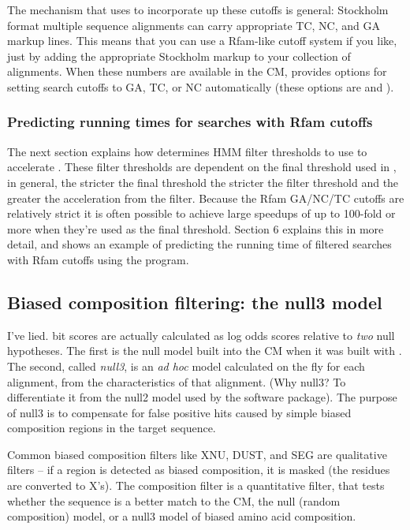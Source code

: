 The mechanism that  uses to incorporate up these cutoffs is
general: Stockholm format multiple sequence alignments can carry
appropriate TC, NC, and GA markup lines. This means that you can use a
Rfam-like cutoff system if you like, just by adding the appropriate
Stockholm markup to your collection of alignments. When these numbers
are available in the CM,  provides options
for setting search cutoffs to GA, TC, or NC automatically (these options
are  and ).

\subsubsection{Predicting running times for searches with Rfam cutoffs}
The next section explains how  determines HMM filter
thresholds to use to accelerate . These filter
thresholds are dependent on the final threshold used in
, in general, the stricter the final threshold the
stricter the filter threshold and the greater the acceleration from
the filter. Because the Rfam GA/NC/TC cutoffs are relatively strict it
is often possible to achieve large speedups of up to 100-fold or more
when they're used as the final threshold. Section 6 explains this in
more detail, and shows an example of predicting the running time of
filtered searches with Rfam cutoffs using the  program.

\subsection{Biased composition filtering: the null3 model}

I've lied.  bit scores are actually calculated as
log odds scores relative to \emph{two} null hypotheses. The first is the null model
built into the CM when it was built with .
The second, called \emph{null3}, is an \emph{ad hoc} model calculated
on the fly for each alignment, from the characteristics of that
alignment. (Why null3? To differentiate it from the null2 model used
by the  software package). The purpose of null3 is to
compensate for false positive hits caused by simple biased composition
regions in the target sequence.

Common biased composition filters like XNU, DUST, and SEG are
qualitative filters -- if a region is detected as biased composition,
it is masked (the residues are converted to X's).  The
 composition filter is a quantitative filter, that
tests whether the sequence is a better match to the CM, the
null (random composition) model, or a null3 model of biased amino acid
composition.

